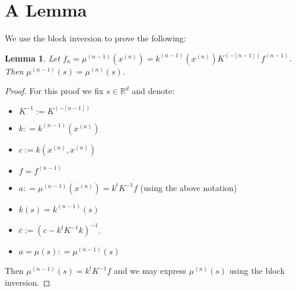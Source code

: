 \documentclass[paper=a4, fontsize=11pt]{scrartcl} %
\newtheorem{lemma}[theorem]{Lemma}
\numberwithin{equation}{section} %
\numberwithin{figure}{section} %
\numberwithin{table}{section} %
\newcommand{\rr}{\mathbb{R}}
\newcommand{\xn}{x^{(n)}}
\newcommand{\kinv}{K^{-1}} %
\begin{document}
\section{A Lemma}
We use the block inversion to prove the following:
\begin{lemma}
Let $f_n = \mu^{(n-1)}(\xn) =  k^{(n-1)}(\xn)K^{(-[n-1])}f^{(n-1)}$. Then $\mu^{(n-1)}(s) = \mu^{(n)}(s)$.
\end{lemma}
\begin{proof}
 For this proof we fix $s\in \rr ^{d}$ and denote:
\begin{itemize}
 \item $\kinv := K^{(-[n-1])}$ 
 \item $k : = k^{(n-1)}(\xn)$
 \item $c := k(\xn,\xn)$
 \item $f = f^{(n-1)}$ 
 \item $a : = \mu^{(n-1)}(\xn) = k^t\kinv f$ (using the above notation)
 \item $k(s) = k^{(n-1)}(s)$
 \item $\bar{c} := (c - k^t\kinv k)^{-1}$. 
 \item $a = \mu(s) : = \mu^{(n-1)}(s)$
\end{itemize}
Then $\mu^{(n-1)}(s) = k^t\kinv f$ and we may express $\mu^{(n)}(s)$ using the block inversion.



\end{proof}
\end{document}
